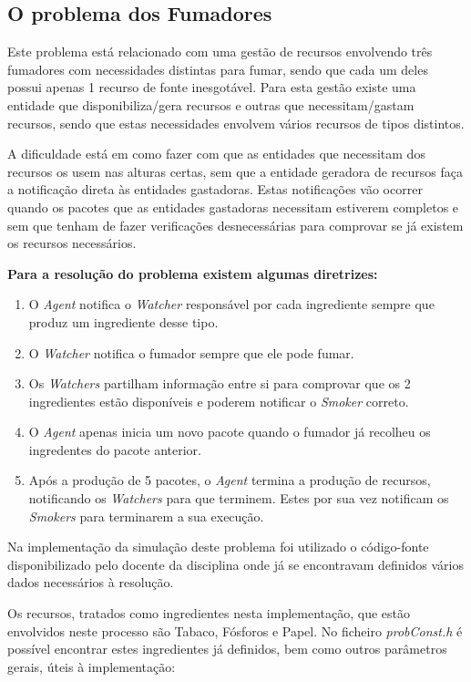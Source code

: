 \documentclass[10pt,portuguese]{article}
\begin{document}
\subsection{O problema dos Fumadores}

\par Este problema está relacionado com uma gestão de recursos envolvendo três fumadores com necessidades distintas para fumar, sendo que cada um deles possui apenas 1 recurso de fonte inesgotável. Para esta gestão existe uma entidade que disponibiliza/gera recursos e outras que necessitam/gastam recursos, sendo que estas necessidades envolvem vários recursos de tipos distintos. 
\par A dificuldade está em como fazer com que as entidades que necessitam dos recursos os usem nas alturas certas, sem que a entidade geradora de recursos faça a notificação direta às entidades gastadoras. Estas notificações vão ocorrer quando os pacotes que as entidades gastadoras necessitam estiverem completos e sem que tenham de fazer verificações desnecessárias para comprovar se já existem os recursos necessários.
\par \textbf{Para a resolução do problema existem algumas diretrizes:}
\begin{enumerate}
  \item O \textit{Agent} notifica o \textit{Watcher} responsável por cada ingrediente sempre que produz um ingrediente desse tipo.
  \item O \textit{Watcher} notifica o fumador sempre que ele pode fumar.
  \item Os \textit{Watchers} partilham informação entre si para comprovar que os 2 ingredientes estão disponíveis e poderem notificar o \textit{Smoker} correto.
  \item O \textit{Agent} apenas inicia um novo pacote quando o fumador já recolheu os ingredentes do pacote anterior.
  \item Após a produção de 5 pacotes, o \textit{Agent} termina a produção de recursos, notificando os \textit{Watchers} para que terminem. Estes por sua vez notificam os \textit{Smokers} para terminarem a sua execução.
\end{enumerate}
\par Na implementação da simulação deste problema foi utilizado o código-fonte disponibilizado pelo docente da disciplina onde já se encontravam definidos vários dados necessários à resolução.

\par Os recursos, tratados como ingredientes nesta implementação, que estão envolvidos neste processo são Tabaco, Fósforos e Papel. No ficheiro \textit{probConst.h} é possível encontrar estes ingredientes já definidos, bem como outros parâmetros gerais, úteis à implementação:
\end{document}
